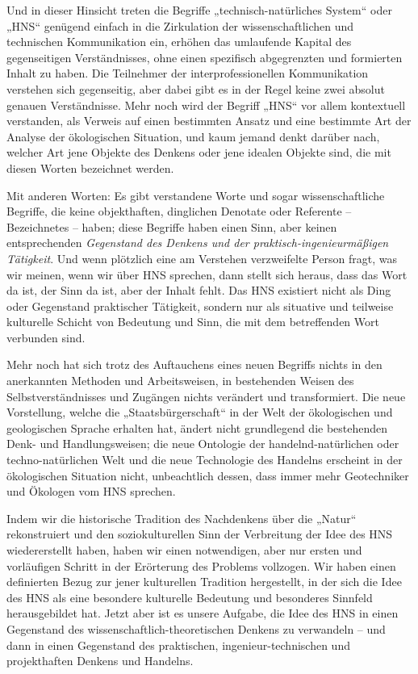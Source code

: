 \documentclass[11pt,a4paper]{article}
\begin{document}
Und in dieser Hinsicht treten die Begriffe „technisch-natürliches System“ oder
„HNS“ genü\-gend einfach in die Zirkulation der wissenschaftlichen und
technischen Kommunikation ein, erhöhen das umlaufende Kapital des
gegenseitigen Verständnisses, ohne einen spezifisch abgegrenzten und
formierten Inhalt zu haben. Die Teilnehmer der interprofessionellen
Kommunikation verstehen sich gegenseitig, aber dabei gibt es in der Regel
keine zwei absolut genauen Verständnisse. Mehr noch wird der Begriff „HNS“ vor
allem kontextuell verstanden, als Verweis auf einen bestimmten Ansatz und eine
bestimmte Art der Analyse der ökologischen Situation, und kaum jemand denkt
darüber nach, welcher Art jene Objekte des Denkens oder jene idealen Objekte
sind, die mit diesen Worten bezeichnet werden.

Mit anderen Worten: Es gibt verstandene Worte und sogar wissenschaftliche
Begriffe, die keine objekthaften, dinglichen Denotate oder Referente --
Bezeichnetes -- haben; diese Begriffe haben einen Sinn, aber keinen
entsprechenden \emph{Gegenstand des Denkens und der praktisch-ingenieurmäßigen
  Tätigkeit}. Und wenn plötzlich eine am Verstehen verzweifelte Person fragt,
was wir meinen, wenn wir über HNS sprechen, dann stellt sich heraus, dass das
Wort da ist, der Sinn da ist, aber der Inhalt fehlt. Das HNS existiert nicht
als Ding oder Gegenstand praktischer Tätigkeit, sondern nur als situative und
teilweise kulturelle Schicht von Bedeutung und Sinn, die mit dem betreffenden
Wort verbunden sind.

Mehr noch hat sich trotz des Auftauchens eines neuen Begriffs nichts in den
anerkannten Methoden und Arbeitsweisen, in bestehenden Weisen des
Selbstverständnisses und Zugängen nichts verändert und transformiert. Die neue
Vorstellung, welche die „Staatsbürgerschaft“ in der Welt der ökologischen und
geologischen Sprache erhalten hat, ändert nicht grundlegend die bestehenden
Denk- und Handlungsweisen; die neue Ontologie der handelnd-natürlichen oder
techno-natürlichen Welt und die neue Technologie des Handelns erscheint in der
ökologischen Situation nicht, unbeachtlich dessen, dass immer mehr
Geotechniker und Ökologen vom HNS sprechen.

Indem wir die historische Tradition des Nachdenkens über die „Natur“
rekonstruiert und den soziokulturellen Sinn der Verbreitung der Idee des HNS
wiedererstellt haben, haben wir einen notwendigen, aber nur ersten und
vorläufigen Schritt in der Erörterung des Problems vollzogen. Wir haben einen
definierten Bezug zur jener kulturellen Tradition hergestellt, in der sich die
Idee des HNS als eine besondere kulturelle Bedeutung und besonderes Sinnfeld
herausgebildet hat.  Jetzt aber ist es unsere Aufgabe, die Idee des HNS in
einen Gegenstand des wissenschaftlich-theoretischen Denkens zu verwandeln --
und dann in einen Gegenstand des praktischen, ingenieur-technischen und
projekthaften Denkens und Handelns.
\end{document}
